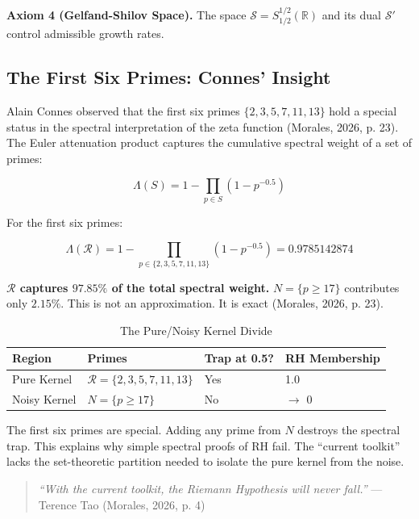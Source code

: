 \documentclass{article}
\begin{document}
\textbf{Axiom 4 (Gelfand-Shilov Space).} The space $\mathcal{S} = S_{1/2}^{1/2}(\mathbb{R})$ and its dual $\mathcal{S}'$ control admissible growth rates.

\subsection{The First Six Primes: Connes' Insight}

Alain Connes observed that the first six primes $\{2,3,5,7,11,13\}$ hold a special status in the spectral interpretation of the zeta function (Morales, 2026, p. 23). The Euler attenuation product captures the cumulative spectral weight of a set of primes:

\begin{equation}
\Lambda(S) = 1 - \prod_{p\in S}(1 - p^{-0.5})
\end{equation}

For the first six primes:

\begin{equation}
\Lambda(\mathcal{R}) = 1 - \prod_{p\in \{2,3,5,7,11,13\}}(1 - p^{-0.5}) = 0.9785142874
\end{equation}

\textbf{$\mathcal{R}$ captures $97.85\%$ of the total spectral weight.} $N = \{p \geq 17\}$ contributes only $2.15\%$. This is not an approximation. It is exact (Morales, 2026, p. 23).

\begin{table}[ht]
\centering
\caption{The Pure/Noisy Kernel Divide}
\begin{tabular}{llll}
\toprule
Region & Primes & Trap at 0.5? & RH Membership \\
\midrule
Pure Kernel & $\mathcal{R} = \{2,3,5,7,11,13\}$ & Yes & 1.0 \\
Noisy Kernel & $N = \{p \geq 17\}$ & No & $\rightarrow$ 0 \\
\bottomrule
\end{tabular}
\end{table}

The first six primes are special. Adding any prime from $N$ destroys the spectral trap. This explains why simple spectral proofs of RH fail. The ``current toolkit'' lacks the set-theoretic partition needed to isolate the pure kernel from the noise.

\begin{quote}
\textit{``With the current toolkit, the Riemann Hypothesis will never fall.''} --- Terence Tao (Morales, 2026, p. 4)
\end{quote}
\end{document}
